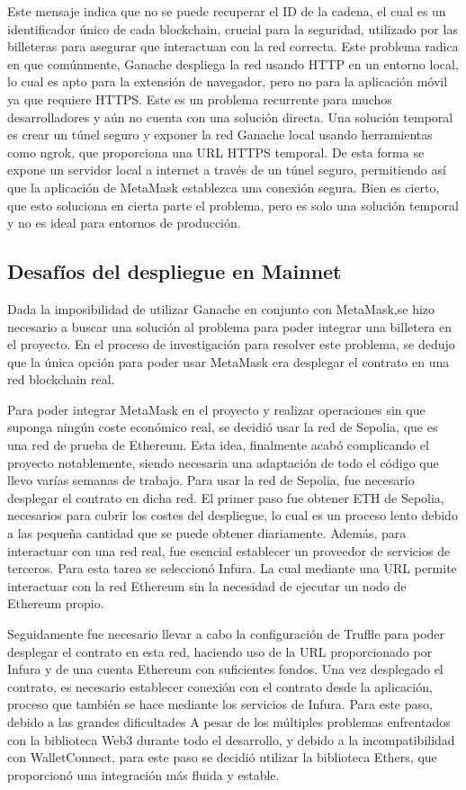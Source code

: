 Este mensaje indica que no se puede recuperar el ID de la cadena, el cual es un identificador único de cada blockchain, crucial para la seguridad, utilizado por las billeteras para asegurar que interactuan con la red correcta.
Este problema radica en que comúnmente, Ganache despliega la red usando HTTP en un entorno local, lo cual es apto para la extensión de navegador, pero no para la aplicación móvil ya que requiere HTTPS.
Este es un problema recurrente para muchos desarrolladores y aún no cuenta con una solución directa. Una solución temporal es crear un túnel seguro y exponer la red Ganache local usando herramientas como ngrok, que proporciona una URL HTTPS temporal. De esta forma se expone un servidor local a internet a través de un túnel seguro, permitiendo así que la aplicación de MetaMask establezca una conexión segura.
Bien es cierto, que esto soluciona en cierta parte el problema, pero es solo una solución temporal y no es ideal para entornos de producción.


\subsection{Desafíos del despliegue en Mainnet}

Dada la imposibilidad de utilizar Ganache en conjunto con MetaMask,se hizo necesario a buscar una solución al problema para poder integrar una billetera en el proyecto.
En el proceso de investigación para resolver este problema, se dedujo que la única opción para poder usar MetaMask era desplegar el contrato en una red blockchain real.

Para poder integrar MetaMask en el proyecto y realizar operaciones sin que suponga ningún coste económico real, se decidió usar la red de Sepolia, que es una red de prueba de Ethereum. 
Esta idea, finalmente acabó complicando el proyecto notablemente, siendo necesaria una adaptación de todo el código que llevo varías semanas de trabajo.
Para usar la red de Sepolia, fue necesario desplegar el contrato en dicha red. El primer paso fue obtener ETH de Sepolia, necesarios para cubrir los costes del despliegue, lo cual es un proceso lento debido a las pequeña cantidad que se puede obtener diariamente. 
Además, para interactuar con una red real, fue esencial establecer un proveedor de servicios de terceros. Para esta tarea se seleccionó Infura. La cual mediante una URL permite interactuar con la red Ethereum sin la necesidad de ejecutar un nodo de Ethereum propio. 

Seguidamente fue necesario llevar a cabo la configuración de Truffle para poder desplegar el contrato en esta red, haciendo uso de la URL proporcionado por Infura y de una cuenta Ethereum con suficientes fondos.
Una vez desplegado el contrato, es necesario establecer conexión con el contrato desde la aplicación, proceso que también se hace mediante los servicios de Infura.
Para este paso, debido a las grandes dificultades 
A pesar de los múltiples problemas enfrentados con la biblioteca Web3 durante todo el desarrollo, y debido a la incompatibilidad con WalletConnect, para este paso se decidió utilizar la biblioteca Ethers, que proporcionó una integración más fluida y estable.

